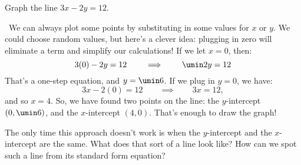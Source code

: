 \begin{boxex}
Graph the line $3x - 2y = 12$.

\exsoln\ We can always plot some points by substituting in some values for $x$ or $y$. We could choose random values, but here's a clever idea: plugging in zero will eliminate a term and simplify our calculations! If we let $x=0$, then:
\[3(0) - 2y = 12 \qquad\implies\qquad \umin2y=12\]
That's a one-step equation, and $y = \umin6$. If we plug in $y=0$, we have:
\[3x - 2(0) = 12 \qquad\implies\qquad 3x=12,\]
and so $x=4$. So, we have found two points on the line: the $y$-intercept $(0,\umin6)$, and the $x$-intercept $(4,0)$. That's enough to draw the graph!

\begin{center}
\end{center}
%

The only time this approach doesn't work is when the $y$-intercept and the $x$-intercept are the same. What does that sort of a line look like? How can we spot such a line from its standard form equation?
\end{boxex}

